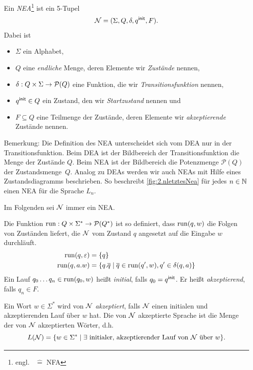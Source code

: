 \goodbreak

\begin{Def}
        Ein \emph{\acf{NEA}}\footnote{engl.\   $\hat=$ \acl{NFA}} ist ein 5-Tupel
        \[ \mathcal{N}= (\Sigma, Q,\delta,q^\mathsf{init},F). \]
Dabei ist
        \begin{itemize}
                \item $\Sigma$ ein Alphabet,
                \item $Q$ eine \emph{endliche} Menge, deren Elemente wir \emph{Zustände} nennen,
                \item $\delta:Q\x\Sigma\->\mathcal{P}(Q)$ eine Funktion, die wir \emph{Transitionsfunktion} nennen,
                \item $q^\mathsf{init}\in Q$ ein Zustand, den wir \emph{Startzustand} nennen und
                \item $F\subseteq Q$ eine Teilmenge der Zustände, deren Elemente wir \emph{akzeptierende} Zustände nennen.
                \qedhere
        \end{itemize}
\end{Def}
Bemerkung: Die Definition des \acs*{NEA} unterscheidet sich vom
\acs*{DEA} nur in der Transitionsfunktion. Beim \acs*{DEA} ist der
Bildbereich der Transitionsfunktion die Menge der Zustände $Q$. Beim
\acs*{NEA} ist der Bildbereich die Potenzmenge $\mathcal{P}(Q)$ der
Zustandsmenge~$Q$. 
Analog zu \acs*{DEA}s werden wir auch \acs*{NEA}s mit Hilfe eines Zustandsdiagramms beschrieben. So beschreibt \autoref{fig:2.nletztesNea} für jedes $n\in\mathbb{N}$ einen \acs*{NEA} für die Sprache $L_n$.

Im Folgenden sei $\mathcal{N}$ immer ein \acs*{NEA}.
\begin{Def}
  Die Funktion $\operatorname{run} : Q \times \Sigma^* \to \mathcal{P}(Q^*)$ ist so definiert, dass $\operatorname{run} (q, w)$ die Folgen von Zuständen liefert, die $\mathcal{N}$ vom Zustand $q$ angesetzt auf die Eingabe $w$ durchläuft. 
  \begin{align}
    \operatorname{run}(q, \varepsilon) & = \{q\} \\
    \operatorname{run}(q, a.w)  & = \{ q. \overline{q} \mid \overline{q} \in \operatorname{run} (q', w), q' \in \delta (q, a) \}
  \end{align}
  Ein Lauf $q_0\dots q_n \in \operatorname{run} (q_0, w)$  heißt \emph{initial}, falls $q_0 = q^\mathsf{init}$.
  Er heißt \emph{akzeptierend}, falls $q_n\in F$.
\end{Def}
\begin{Def}[Akzeptanz]
	Ein Wort $w\in\Sigma^*$ wird von $\mathcal{N}$ \emph{akzeptiert}, falls $\mathcal{N}$ einen initialen und akzeptierenden Lauf über $w$ hat.
	Die von $\mathcal{N}$ akzeptierte Sprache ist die Menge der von $\mathcal{N}$ akzeptierten Wörter, d.h.\
	$$L(\mathcal{N})=\{ w\in\Sigma^* \mid \exists\text{ initialer, akzeptierender Lauf von $\mathcal{N}$ über }w \} \text.$$
\end{Def}




